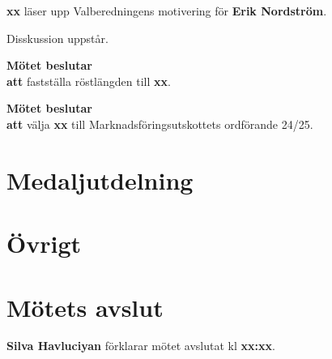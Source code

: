 \documentclass{datateknologsektionen-document}
\newcommand{\ind}{\hspace*{2em}}
\newcommand{\motetbeslutar}{\textbf{Mötet beslutar}}
\newcommand{\att}{\\\ind\textbf{att}}
\newcommand{\rostlangd}[1]{\motetbeslutar\att{} fastställa röstlängden till \textbf{#1}.}
\begin{document}
\textbf{xx} läser upp Valberedningens motivering för \textbf{Erik Nordström}.

Disskussion uppstår.

\rostlangd{xx}

\motetbeslutar\att{} välja \textbf{xx} till Marknadsföringsutskottets ordförande 24/25.


\pagebreak

\section{Medaljutdelning}



\section{Övrigt}

\section{Mötets avslut}


\textbf{Silva Havluciyan} förklarar mötet avslutat kl \textbf{xx:xx}.


\end{document}
